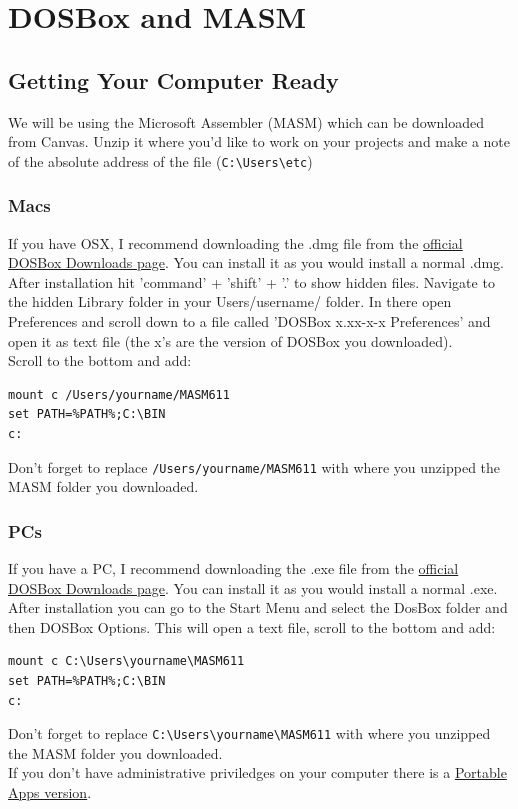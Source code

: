 \chapter{DOSBox and MASM}
\section {Getting Your Computer Ready}
We will be using the Microsoft Assembler (MASM) which can be downloaded from Canvas.  Unzip it where you'd like to work on your projects and make a note of the absolute address of the file (\verb|C:\Users\etc|)
\subsection{Macs}
If you have OSX, I recommend downloading the .dmg file from the \href{https://www.dosbox.com/download.php?main=1}{official DOSBox Downloads page}.  You can install it as you would install a normal .dmg.  \\
\indent After installation hit 'command' + 'shift' + '.' to show hidden files.  Navigate to the hidden {\code Library} folder in your {\code Users/username/} folder.  In there open Preferences and scroll down to a file called 'DOSBox x.xx-x-x Preferences' and open it as text file (the x's are the version of DOSBox you downloaded).\\
Scroll to the bottom and add:
\begin{verbatim}
mount c /Users/yourname/MASM611
set PATH=%PATH%;C:\BIN
c:
\end{verbatim}
Don't forget to replace \verb|/Users/yourname/MASM611| with where you unzipped the MASM folder you downloaded.  

\subsection{PCs}
If you have a PC, I recommend downloading the .exe file from the \href{https://www.dosbox.com/download.php?main=1}{official DOSBox Downloads page}.  You can install it as you would install a normal .exe.  \\
After installation you can go to the Start Menu and select the DosBox folder and then DOSBox Options.  This will open a text file, scroll to the bottom and add: 
\begin{verbatim}
mount c C:\Users\yourname\MASM611
set PATH=%PATH%;C:\BIN
c:
\end{verbatim}
Don't forget to replace \verb|C:\Users\yourname\MASM611| with where you unzipped the MASM folder you downloaded.  \\
If you don't have administrative priviledges on your computer there is a \href{https://portableapps.com/apps/games/dosbox_portable}{Portable Apps version}. 
